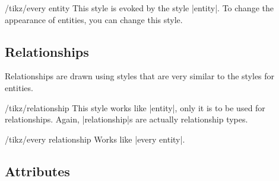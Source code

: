 \begin{stylekey}{/tikz/every entity}
    This style is evoked by the style |entity|. To change the appearance of
    entities, you can change this style.
\begin{codeexample}[preamble={\usetikzlibrary{positioning}}]
\end{codeexample}
\end{stylekey}


\subsection{Relationships}

Relationships are drawn using styles that are very similar to the styles for
entities.

\begin{stylekey}{/tikz/relationship}
    This style works like |entity|, only it is to be used for relationships.
    Again, |relationship|s are actually relationship types.
\begin{codeexample}[]
\end{codeexample}
\end{stylekey}

\begin{stylekey}{/tikz/every relationship}
    Works like |every entity|.
\begin{codeexample}[]
\end{codeexample}
\end{stylekey}


\subsection{Attributes}

